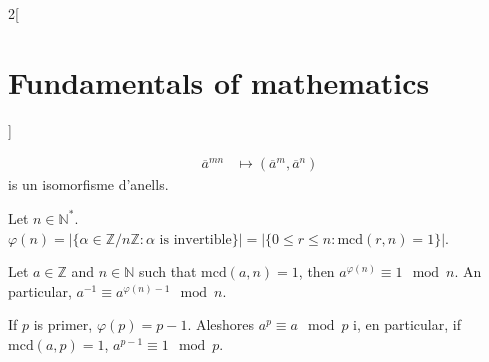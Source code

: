 \documentclass[../../../main.tex]{subfiles}
\begin{document}
\begin{multicols}{2}[\section{Fundamentals of mathematics}]
\begin{theorem}
\begin{align*}
        \overline{a}^{\scriptscriptstyle mn}&\mapsto(\overline{a}^{\scriptscriptstyle m},\overline{a}^{\scriptscriptstyle n})
    \end{align*}
    is un isomorfisme d'anells.
    \end{theorem}
    \begin{definition}
    Let $n\in\mathbb{N}^*$. $\varphi(n)=|\{\alpha\in\mathbb{Z}/n\mathbb{Z}:\alpha \text{ is invertible}\}|=|\{0\leq r\leq n: \text{mcd}(r,n)=1\}|$.
    \end{definition}
    \begin{theorem}
    Let $a\in\mathbb{Z}$ and $n\in\mathbb{N}$ such that $\text{mcd}(a,n)=1$, then $a^{\varphi(n)}\equiv 1\mod n$. An particular, $a^{-1}\equiv a^{\varphi(n)-1}\mod n$.
    \end{theorem}
    \begin{theorem}
    If $p$ is primer, $\varphi(p)=p-1$. Aleshores $a^p\equiv a\mod p$ i, en particular, if $\text{mcd}(a,p)=1$, $a^{p-1}\equiv 1\mod p$.
    \end{theorem}

\end{multicols}
\end{document}
